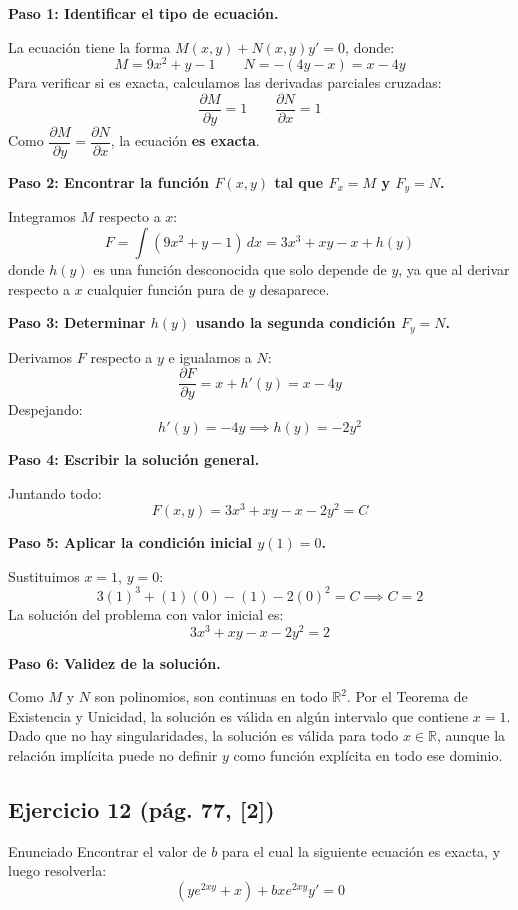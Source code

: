 \begin{respuesta}

\textbf{Paso 1: Identificar el tipo de ecuación.}

La ecuación tiene la forma $M(x,y) + N(x,y)y' = 0$, donde:
\[
    M = 9x^2 + y - 1 \qquad N = -(4y - x) = x - 4y
\]
Para verificar si es exacta, calculamos las derivadas parciales cruzadas:
\[
    \frac{\partial M}{\partial y} = 1 \qquad \frac{\partial N}{\partial x} = 1
\]
Como $\dfrac{\partial M}{\partial y} = \dfrac{\partial N}{\partial x}$, 
la ecuación \textbf{es exacta}.

\medskip
\textbf{Paso 2: Encontrar la función $F(x,y)$ tal que $F_x = M$ y $F_y = N$.}

Integramos $M$ respecto a $x$:
\[
    F = \int (9x^2 + y - 1)\, dx = 3x^3 + xy - x + h(y)
\]
donde $h(y)$ es una función desconocida que solo depende de $y$, 
ya que al derivar respecto a $x$ cualquier función pura de $y$ desaparece.

\medskip
\textbf{Paso 3: Determinar $h(y)$ usando la segunda condición $F_y = N$.}

Derivamos $F$ respecto a $y$ e igualamos a $N$:
\[
    \frac{\partial F}{\partial y} = x + h'(y) = x - 4y
\]
Despejando:
\[
    h'(y) = -4y \implies h(y) = -2y^2
\]

\medskip
\textbf{Paso 4: Escribir la solución general.}

Juntando todo:
\[
    F(x,y) = 3x^3 + xy - x - 2y^2 = C
\]

\medskip
\textbf{Paso 5: Aplicar la condición inicial $y(1) = 0$.}

Sustituimos $x = 1$, $y = 0$:
\[
    3(1)^3 + (1)(0) - (1) - 2(0)^2 = C \implies C = 2
\]
La solución del problema con valor inicial es:
\[
    \boxed{3x^3 + xy - x - 2y^2 = 2}
\]

\medskip
\textbf{Paso 6: Validez de la solución.}

Como $M$ y $N$ son polinomios, son continuas en todo $\mathbb{R}^2$. 
Por el Teorema de Existencia y Unicidad, la solución es válida 
en algún intervalo que contiene $x = 1$. Dado que no hay 
singularidades, la solución es válida para todo $x \in \mathbb{R}$, 
aunque la relación implícita puede no definir $y$ como función 
explícita en todo ese dominio.

\end{respuesta}

\subsection*{Ejercicio 12 \quad\normalfont\small(pág. 77, [2])}
\begin{enunciado}{Enunciado}
    Encontrar el valor de $b$ para el cual la siguiente ecuación es exacta,
    y luego resolverla:
    \[
        \left(ye^{2xy} + x\right) + bxe^{2xy}y' = 0
    \]
\end{enunciado}

